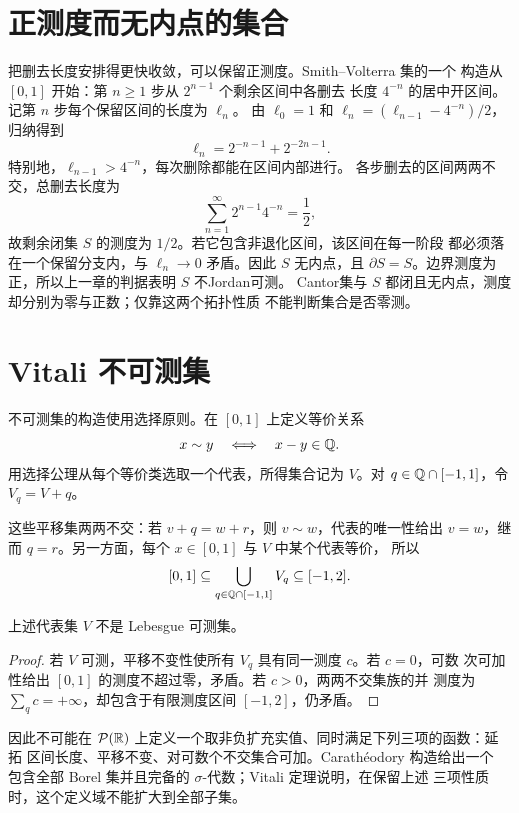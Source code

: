 \section{正测度而无内点的集合}

把删去长度安排得更快收敛，可以保留正测度。Smith--Volterra 集的一个
构造从 $[0,1]$ 开始：第 $n\ge1$ 步从 $2^{n-1}$ 个剩余区间中各删去
长度 $4^{-n}$ 的居中开区间。记第 $n$ 步每个保留区间的长度为 $\ell_n$。
由 $\ell_0=1$ 和 $\ell_n=(\ell_{n-1}-4^{-n})/2$，归纳得到
\[
 \ell_n=2^{-n-1}+2^{-2n-1}.
\]
特别地，$\ell_{n-1}>4^{-n}$，每次删除都能在区间内部进行。
各步删去的区间两两不交，总删去长度为
\[
 \sum_{n=1}^{\infty}2^{n-1}4^{-n}=\frac12,
\]
故剩余闭集 $S$ 的测度为 $1/2$。若它包含非退化区间，该区间在每一阶段
都必须落在一个保留分支内，与 $\ell_n\to0$ 矛盾。因此 $S$ 无内点，且
$\partial S=S$。边界测度为正，所以上一章的判据表明 $S$ 不Jordan可测。
Cantor集与 $S$ 都闭且无内点，测度却分别为零与正数；仅靠这两个拓扑性质
不能判断集合是否零测。

\section{Vitali 不可测集}

不可测集的构造使用选择原则。在 $[0,1]$ 上定义等价关系
\[
 x\sim y\quad\Longleftrightarrow\quad x-y\in\mathbb{Q}.
\]
用选择公理从每个等价类选取一个代表，所得集合记为 $V$。对
$q\in\mathbb{Q}\cap[-1,1]$，令 $V_q=V+q$。

这些平移集两两不交：若 $v+q=w+r$，则 $v\sim w$，代表的唯一性给出
$v=w$，继而 $q=r$。另一方面，每个 $x\in[0,1]$ 与 $V$ 中某个代表等价，
所以
\[
 [0,1]\subseteq\bigcup_{q\in\mathbb{Q}\cap[-1,1]}V_q
 \subseteq[-1,2].
\]

\begin{theorem}[Vitali]
\label{thm:vitali-nonmeasurable-set}
上述代表集 $V$ 不是 Lebesgue 可测集。
\end{theorem}

\begin{proof}
若 $V$ 可测，平移不变性使所有 $V_q$ 具有同一测度 $c$。若 $c=0$，可数
次可加性给出 $[0,1]$ 的测度不超过零，矛盾。若 $c>0$，两两不交集族的并
测度为 $\sum_qc=+\infty$，却包含于有限测度区间 $[-1,2]$，仍矛盾。
\end{proof}

因此不可能在 $\mathcal P(\mathbb{R})$ 上定义一个取非负扩充实值、同时满足下列三项的函数：延拓
区间长度、平移不变、对可数个不交集合可加。Carathéodory 构造给出一个
包含全部 Borel 集并且完备的 $\sigma$-代数；Vitali 定理说明，在保留上述
三项性质时，这个定义域不能扩大到全部子集。

